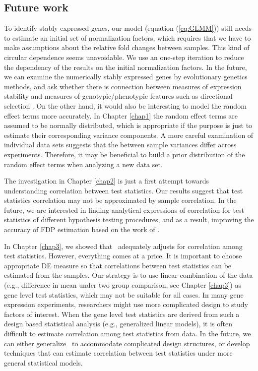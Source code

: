\subsection{Future work}
To identify stably expressed genes, our model (equation (\ref{eq:GLMM})) still needs to estimate an 
initial set of normalization factors, which requires that we have to make assumptions about the 
relative fold changes between samples. This kind of circular dependence seems unavoidable. We use 
an one-step iteration to reduce the dependency of the results on the initial normalization factors. 
In the future, we can examine the numerically stably expressed genes by evolutionary genetics 
methods, and ask whether there is connection between measures of expression stability and measures 
of genotypic/phenotypic features such as directional selection \citep{sabeti2006positive}.
On the other hand, it would also be interesting to model the random effect terms more accurately. 
In Chapter \ref{chap1} the random effect terms are assumed to be normally distributed, which is 
appropriate 
if the purpose is just to estimate their corresponding variance components. A more careful 
examination of individual data sets suggests that the between sample variances differ across 
experiments. Therefore, it may be beneficial to build a prior distribution of the random effect 
terms when analyzing a new data set. 

The investigation in Chapter \ref{chap2} is just a first attempt towards understanding correlation 
between  test statistics. Our results suggest that test statistics correlation may not be 
approximated 
by sample correlation. In the future, we are interested in finding analytical expressions of 
correlation for test statistics of different hypothesis testing procedures, and as a result, 
improving the accuracy of FDP estimation based on the work of \citet{efron2007correlation}. 

In Chapter \ref{chap3}, we showed that \OurMethod~adequately adjusts for correlation among test 
statistics. However, everything comes at a price. 
It is important to choose appropriate DE measure so that correlations between test statistics can 
be estimated from the samples. Our strategy is to use linear combination of the data (e.g., 
difference in mean under two group comparison, see Chapter \ref{chap3}) as gene level test 
statistics, which may not be suitable for all cases. In many gene expression experiments, 
researchers  might use more complicated design to study factors of interest. When the gene level 
test statistics are derived from such a design based statistical analysis (e.g., generalized 
linear models), it is often difficult to estimate correlation among test statistics from data. In 
the future, we can either generalize \OurMethod~to accommodate complicated design structures, or 
develop techniques that can estimate correlation between test statistics under 
more general statistical models.  










